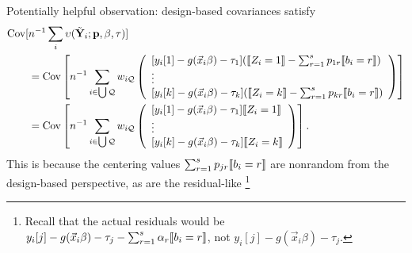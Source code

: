 \documentclass{article}
\DeclarePairedDelimiter{\indicator}{\llbracket}{\rrbracket}
\begin{document}
Potentially helpful observation: design-based covariances satisfy
\begin{align*}
  \operatorname{Cov}[&n^{-1}\sum_{i}\upsilon(\tilde{\mathbf{Y}}_{i};
  \mathbf{p}, \beta, \tau)] \\
                     &=   \operatorname{Cov}\left[n^{-1}\sum_{i \in \bigcup \mathcal{Q}}
                       w_{i\mathcal{Q}}
\left(
                                             \begin{array}{l}                                               
           [y_{i}[1]
                                               -
                                               g(\vec{x}_{i}\beta)-\tau_{1}](
                                               \indicator{Z_{i}=1} - \sum_{r=1}^{s}p_{1r}\indicator{b_{i}=r})\\
                  \vdots \\
{}           [y_{i}[k]
                                               - g(\vec{x}_{i}\beta) -
                                               \tau_{k}](\indicator{Z_{i}=k}
                                               - \sum_{r=1}^{s}p_{kr}\indicator{b_{i}=r})\\                                             \end{array}
\right) \right]\\
                     &=  \operatorname{Cov}\left[n^{-1}\sum_{i \in \bigcup \mathcal{Q}}
w_{i\mathcal{Q}}
\left(
                                             \begin{array}{l}                                               
           [y_{i}[1]
                                               -
                                               g(\vec{x}_{i}\beta)-\tau_{1}]
                                               \indicator{Z_{i}=1}\\
                  \vdots \\
{}           [y_{i}[k]
                                               - g(\vec{x}_{i}\beta) -
                                               \tau_{k}]\indicator{Z_{i}=k}\\                                             \end{array}
\right)
\right].
\end{align*}
This is because the centering values
$\sum_{r=1}^{s}p_{jr}\indicator{b_{i}=r}$ are nonrandom from the
design-based perspective, as are the residual-like%
\footnote{Recall that the actual residuals would be $y_{i}[j] -
  g(\vec{x}_{i}\beta) - \tau_{j} - \sum_{r=1}^{s}\alpha_{r}\indicator{b_{i}=r}$, not $y_{i}[j] - g(\vec{x}_{i}\beta) - \tau_{j}$.}
\end{document}
